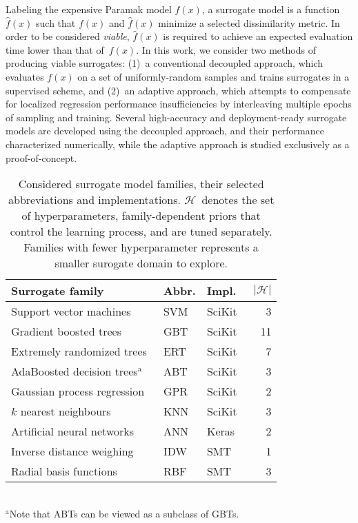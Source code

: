 Labeling the expensive Paramak model $f(x)$, a surrogate model is a function
$\hat{f}(x)$ such that $f(x)$ and $\hat{f}(x)$ minimize a selected dissimilarity
metric. In order to be considered \textit{viable}, $\hat{f}(x)$ is required to
achieve an expected evaluation time lower than that of~$f(x)$. In this work, we
consider two methods of producing viable surrogates: (1)~a conventional decoupled
approach, which evaluates $f(x)$ on a set of uniformly-random samples and
trains surrogates in a supervised scheme, and (2)~an adaptive approach, which attempts to
compensate for localized regression performance insufficiencies by interleaving
multiple epochs of sampling and training. Several high-accuracy and deployment-ready surrogate models are developed using the decoupled approach, and their performance characterized numerically, while the adaptive approach is studied exclusively as a proof-of-concept.

\begin{table}[t]
	\setlength\tabcolsep{1pt}
	\renewcommand{\arraystretch}{0.95}
	\caption{\label{tbl:surrogates}Considered surrogate model families, their
		selected abbreviations and implementations. $\mathcal{H}$~denotes the
		set of hyperparameters, family-dependent priors that control the
		learning process, and are tuned separately. Families with fewer
		hyperparameter represents a smaller surogate domain to explore.}
	\begin{indented}
	\item[]
		\begin{tabular}{lllr}
		\toprule
		Surrogate family & Abbr. & Impl. & $|\mathcal{H}|$ \\
		\midrule
		Support vector machines~\cite{fan2008liblinear}	& SVM & SciKit~\cite{scikit-learn} & 3 \\
		Gradient boosted trees~\cite{friedman2001greedy,friedman1999stochastic,hastie2009elements}	& GBT & SciKit & 11 \\
		Extremely randomized trees~\cite{geurts2006extremely}	& ERT & SciKit & 7 \\
		AdaBoosted decision trees$^\text{a}$~\cite{drucker1997improving}	& ABT & SciKit & 3 \\
		Gaussian process regression~\cite{williams2006gaussian}	& GPR & SciKit & 2 \\
		$k$ nearest neighbours	& KNN & SciKit & 3 \\
		Artificial neural networks	& ANN & Keras~\cite{chollet2015keras} & 2 \\
		Inverse distance weighing~\cite{shepard1968two} & IDW & SMT~\cite{SMT2019} & 1 \\
		Radial basis functions & RBF & SMT & 3 \\
		\bottomrule
		\end{tabular}\\%
		{\footnotesize $^\text{a}$Note that ABTs can be viewed as a subclass of GBTs.}
	\end{indented}
\end{table}

